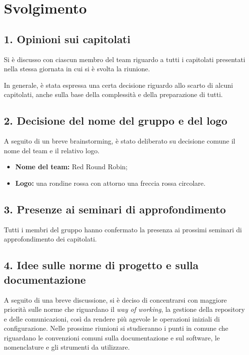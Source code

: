 \newpage
\section*{Svolgimento}

\subsection*{1. Opinioni sui capitolati}

Si è discusso con ciascun membro del team riguardo a tutti i capitolati presentati nella stessa giornata in cui si è svolta la riunione. 

In generale, è stata espressa una certa decisione riguardo allo scarto di alcuni capitolati, anche sulla base della complessità e della preparazione di tutti.

\subsection*{2. Decisione del nome del gruppo e del logo}

A seguito di un breve brainstorming, è stato deliberato su decisione comune il nome del team e il relativo logo.

\begin{itemize}
	\item \textbf{Nome del team:} Red Round Robin;
	\item \textbf{Logo:} una rondine rossa con attorno una freccia rossa circolare.
\end{itemize}

\subsection*{3. Presenze ai seminari di approfondimento}

Tutti i membri del gruppo hanno confermato la presenza ai prossimi seminari di approfondimento dei capitolati.

\subsection*{4. Idee sulle norme di progetto e sulla documentazione}

A seguito di una breve discussione, si è deciso di concentrarsi con maggiore priorità sulle norme che riguardano il \textit{way of working}, la gestione della repository e delle comunicazioni, così da rendere più agevole le operazioni iniziali di configurazione.
Nelle prossime riunioni si studieranno i punti in comune che riguardano le convenzioni comuni sulla documentazione e sul software, le nomenclature e gli strumenti da utilizzare. 

